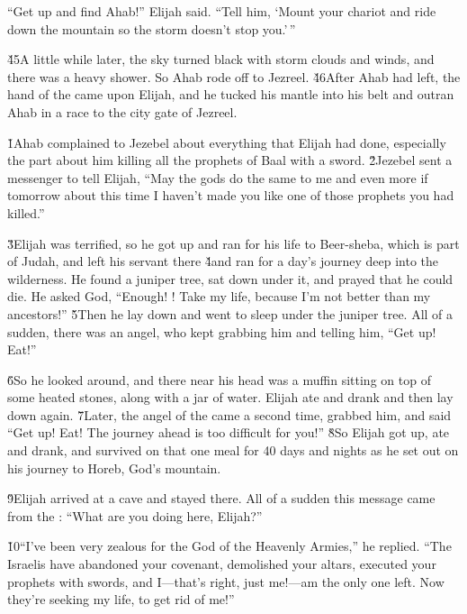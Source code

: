 ``Get up and find Ahab!'' Elijah said. ``Tell him, `Mount your chariot and ride down the mountain so the storm doesn't stop you.'\,''

\v{45}A little while later, the sky turned black with storm clouds and winds, and there was a heavy shower. So Ahab rode off to Jezreel. \v{46}After Ahab had left, the hand of the  came upon Elijah, and he tucked his mantle into his belt and outran Ahab in a race to the city gate of Jezreel.

\v{1}Ahab complained to Jezebel about everything that Elijah had done, especially the part about him killing all the prophets of Baal with a sword. \v{2}Jezebel sent a messenger to tell Elijah, ``May the gods do the same to me and even more if tomorrow about this time I haven't made you like one of those prophets you had killed.''

\v{3}Elijah was terrified, so he got up and ran for his life to Beer-sheba, which is part of Judah, and left his servant there \v{4}and ran for a day's journey deep into the wilderness. He found a juniper tree, sat down under it, and prayed that he could die. He asked God, ``Enough! ! Take my life, because I'm not better than my ancestors!'' \v{5}Then he lay down and went to sleep under the juniper tree. All of a sudden, there was an angel, who kept grabbing him and telling him, ``Get up! Eat!''

\v{6}So he looked around, and there near his head was a muffin sitting on top of some heated stones, along with a jar of water. Elijah ate and drank and then lay down again. \v{7}Later, the angel of the  came a second time, grabbed him, and said ``Get up! Eat! The journey ahead is too difficult for you!'' \v{8}So Elijah got up, ate and drank, and survived on that one meal for 40 days and nights as he set out on his journey to Horeb, God's mountain.

\v{9}Elijah arrived at a cave and stayed there. All of a sudden this message came from the : ``What are you doing here, Elijah?''

\v{10}``I've been very zealous for the  God of the Heavenly Armies,'' he replied. ``The Israelis have abandoned your covenant, demolished your altars, executed your prophets with swords, and I---that's right, just me!---am the only one left. Now they're seeking my life, to get rid of me!''

